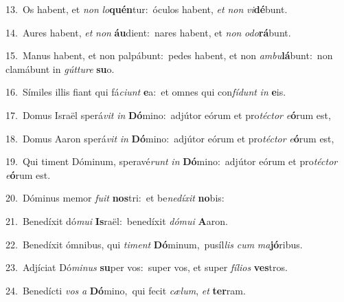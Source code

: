{\numbfont\textcolor{\numbcolor}{13.}}~Os habent, et \textit{non} \textit{lo}\-\textbf{quén}tur:~\star óculos habent, \textit{et} \textit{non} \textit{vi}\-\textbf{dé}bunt.\par
{\numbfont\textcolor{\numbcolor}{14.}}~Aures habent, \textit{et} \textit{non} \textbf{áu}\-dient:~\star nares habent, et \textit{non} \textit{o}\-\textit{do}\textbf{rá}bunt.\par
{\numbfont\textcolor{\numbcolor}{15.}}~Manus habent, et non palpábunt:~\dagger pedes habent, et non \textit{am}\-\textit{bu}\textbf{lá}bunt:~\star non clamábunt in \textit{gút}\-\textit{tu}\textit{re} \textbf{su}\-o.\par
{\numbfont\textcolor{\numbcolor}{16.}}~Símiles illis fiant qui fá\-\textit{ci}\-\textit{unt} \textbf{e}\-a:~\star et omnes qui con\-\textit{fí}\-\textit{dunt} \textit{in} \textbf{e}\-is.\par
{\numbfont\textcolor{\numbcolor}{17.}}~Domus Israël sperá\textit{vit} \textit{in} \textbf{Dó}\-mino:~\star adjútor eórum et pro\-\textit{téc}\-\textit{tor} \textit{e}\-\textbf{ó}rum est,\par
{\numbfont\textcolor{\numbcolor}{18.}}~Domus Aaron sperá\textit{vit} \textit{in} \textbf{Dó}\-mino:~\star adjútor eórum et pro\-\textit{téc}\-\textit{tor} \textit{e}\-\textbf{ó}rum est,\par
{\numbfont\textcolor{\numbcolor}{19.}}~Qui timent Dóminum, speravé\textit{runt} \textit{in} \textbf{Dó}\-mino:~\star adjútor eórum et pro\-\textit{téc}\-\textit{tor} \textit{e}\-\textbf{ó}rum est.\par
{\numbfont\textcolor{\numbcolor}{20.}}~Dóminus memor \textit{fu}\-\textit{it} \textbf{nos}\-tri:~\star et be\-\textit{ne}\-\textit{dí}\textit{xit} \textbf{no}\-bis:\par
{\numbfont\textcolor{\numbcolor}{21.}}~Benedíxit dó\-\textit{mu}\-\textit{i} \textbf{Is}\-raël:~\star benedíxit \textit{dó}\-\textit{mu}\textit{i} \textbf{A}\-aron.\par
{\numbfont\textcolor{\numbcolor}{22.}}~Benedíxit ómnibus, qui \textit{ti}\-\textit{ment} \textbf{Dó}\-minum,~\star pusíl\textit{lis} \textit{cum} \textit{ma}\-\textbf{jó}ribus.\par
{\numbfont\textcolor{\numbcolor}{23.}}~Adjíciat Dó\-\textit{mi}\-\textit{nus} \textbf{su}\-per vos:~\star super vos, et super \textit{fí}\-\textit{li}\textit{os} \textbf{ves}\-tros.\par
{\numbfont\textcolor{\numbcolor}{24.}}~Benedícti \textit{vos} \textit{a} \textbf{Dó}\-mino,~\star qui fecit \textit{cæ}\-\textit{lum}, \textit{et} \textbf{ter}\-ram.\par
